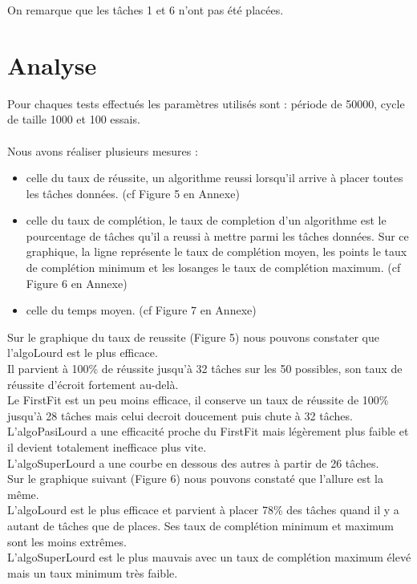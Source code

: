 \documentclass[11pt]{article}
\begin{document}
On remarque que les tâches 1 et 6 n'ont pas été placées.


\section{Analyse}
Pour chaques tests effectués les paramètres utilisés sont : période de 50000, cycle de taille 1000 et 100 essais.\\
\\
Nous avons réaliser plusieurs mesures :
\begin{itemize}
    \item celle du taux de réussite, un algorithme reussi lorsqu'il arrive à placer toutes les tâches données. (cf Figure 5 en Annexe)
    \item celle du taux de complétion, le taux de completion d'un algorithme est le pourcentage de tâches qu'il a reussi à mettre parmi les tâches données. Sur ce graphique, la ligne représente le taux de complétion moyen, les points le taux de complétion minimum et les losanges le taux de complétion maximum. (cf Figure 6 en Annexe)
    \item celle du temps moyen. (cf Figure 7 en Annexe)\\
\end{itemize}

 Sur le graphique du taux de reussite (Figure 5) nous pouvons constater que l'algoLourd est le plus efficace.\\
 Il parvient à 100\% de réussite jusqu'à 32 tâches sur les 50 possibles, son taux de réussite d'écroit fortement au-delà.\\
 Le FirstFit est un peu moins efficace, il conserve un taux de réussite de 100\% jusqu'à 28 tâches mais celui decroit doucement puis chute à 32 tâches.\\
 L'algoPasiLourd a une efficacité proche du FirstFit mais légèrement plus faible et il devient totalement inefficace plus vite.\\
 L'algoSuperLourd a une courbe en dessous des autres à partir de 26 tâches.\\

 Sur le graphique suivant (Figure 6) nous pouvons constaté que l'allure est la même.\\
L'algoLourd est le plus efficace et parvient à placer 78\% des tâches quand il y a autant de tâches que de places. Ses taux de complétion minimum et maximum sont les moins extrêmes.\\ 
L'algoSuperLourd est le plus mauvais avec un taux de complétion maximum élevé mais un taux minimum très faible.\\
\end{document}
